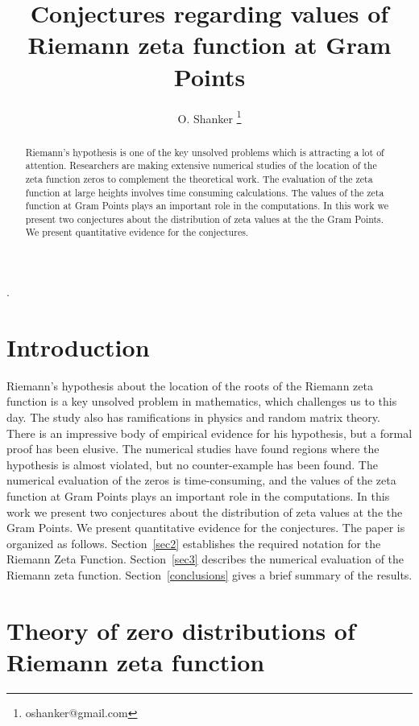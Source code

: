 \documentclass[12pt]{article}
\title{Conjectures regarding values of Riemann zeta function at Gram Points}
\begin{document}
\author{O. Shanker 
\protect\footnote{oshanker@gmail.com}}.


\maketitle

\begin{abstract}
Riemann's hypothesis is one of the key unsolved problems which is attracting
a lot of attention. 
Researchers are making extensive numerical studies of the location of the 
zeta function zeros to complement the theoretical work. 
The evaluation of the zeta function at large heights involves time consuming
calculations. The values of the 
zeta function at Gram Points plays an important role in the computations. In 
this work we present two conjectures about the distribution of zeta values at the 
the Gram Points. We present quantitative evidence for the conjectures.
\end{abstract}



\section{Introduction}
Riemann's hypothesis about the location of 
the roots of the Riemann zeta function is a key unsolved problem in mathematics,
which challenges us to this day. The study also has ramifications in physics and
random matrix theory. 
There is an impressive body of empirical evidence for his hypothesis,
but a formal proof has been elusive. The numerical studies have found
regions where the hypothesis is almost violated, but no counter-example has
been found. The numerical evaluation of the zeros is time-consuming, and the values of the 
zeta function at Gram Points plays an important role in the computations. In 
this work we present two conjectures about the distribution of zeta values at the 
the Gram Points. We present quantitative evidence for the conjectures. The paper is organized as follows.
Section~\ref{sec2} establishes the required notation for the 
Riemann Zeta Function. 
Section~\ref{sec3} describes the numerical evaluation of the Riemann zeta function. 
Section~\ref{conclusions}
gives a brief summary of the results. 


\section{\label{sec2}Theory of zero distributions of Riemann zeta function }
\end{document}
